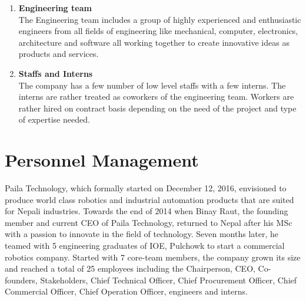 \documentclass[12pt,a4paper]{scrreprt}
\begin{document}
\begin{enumerate}
            \item \textbf{Engineering team} \\
            The Engineering team includes a group of highly experienced and enthusiastic engineers from all fields of engineering like mechanical, computer, electronics, architecture and software all working together to create innovative ideas as products and services.

            \item \textbf{Staffs and Interns} \\
            The company has a few number of low level staffs with a few interns. The interns are rather treated as coworkers of the engineering team. Workers are rather hired on contract basis depending on the need of the project and type of expertise needed.


        \end{enumerate}


\chapter{Personnel Management}
Paila Technology, which formally started on December 12, 2016, envisioned to produce world class robotics and industrial automation products that are suited for Nepali industries. Towards the end of 2014 when Binay Raut, the founding member and current CEO of Paila Technology, returned to Nepal after his MSc with a passion to innovate in the field of technology. Seven months later, he teamed with 5 engineering graduates of IOE, Pulchowk to start a commercial robotics company. Started with 7 core-team members, the company grown its size and reached a total of 25 employees including the Chairperson, CEO, Co-founders, Stakeholders, Chief Technical Officer, Chief Procurement Officer, Chief Commercial Officer, Chief Operation Officer, engineers and interns.
\end{document}
